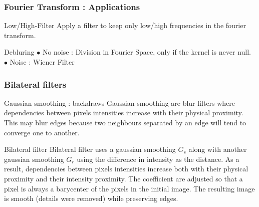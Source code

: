 \documentclass[pdf]{beamer}
\begin{document}
\begin{frame}
\frametitle{Fourier Transform : Applications}

\begin{exampleblock}{Low/High-Filter}
Apply a filter to keep only low/high frequencies in the fourier transform.
\end{exampleblock}


\begin{exampleblock}{Debluring}
$\bullet$ No noise : Division in Fourier Space, only if the kernel is never null.\newline
$\bullet$ Noise : Wiener Filter
\end{exampleblock}

\end{frame}

\begin{frame}
\frametitle{Bilateral filters}


\begin{exampleblock}{Gaussian smoothing : backdraws}
Gaussian smoothing are blur filters where dependencies between pixels intensities increase with their physical proximity. \newline
This may blur edges because two neighbours separated by an edge will tend to converge one to another.
\end{exampleblock}

\begin{block}{Bilateral filter}
Bilateral filter uses a gaussian smoothing $G_s$ along with another gaussian smoothing $G_r$ using the difference in intensity as the distance.\newline
As a result, dependencies between pixels intensities increase both with their physical proximity and their intensity proximity. \newline
The coefficient are adjusted so that a pixel is always a barycenter of the pixels in the initial image.\newline
The resulting image is smooth (details were removed) while preserving edges.
\end{block}

\end{frame}
\end{document}
